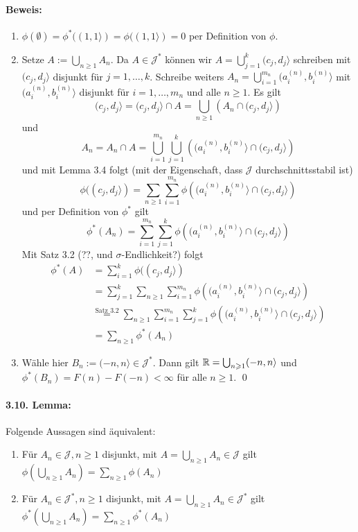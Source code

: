 \paragraph{Beweis:}
\begin{enumerate}[label=(\roman*)]
    \item $\phi(\emptyset)=\phi^*((1,1\rangle)=\phi((1,1\rangle)=0$ per Definition von $\phi$.
    \item Setze $A:=\bigcup_{n\geq1}A_n$. Da $A\in\mathcal{J}^*$ k\"onnen wir $A=\bigcup_{j=1}^k(c_j,d_j\rangle$ schreiben mit $(c_j,d_j\rangle$ disjunkt f\"ur $j=1,\hdots,k$. Schreibe weiters $A_n=\bigcup_{i=1}^{m_n}(a_i^{(n)},b_i^{(n)}\rangle$ mit $(a_i^{(n)},b_i^{(n)}\rangle$ disjunkt f\"ur $i=1,\hdots,m_n$ und alle $n\geq1$. Es gilt 
    $$(c_j,d_j\rangle=(c_j,d_j\rangle\cap A=\bigcup_{n\geq1}\left(A_n\cap(c_j,d_j\rangle\right)$$
    und
    $$A_n=A_n\cap A=\bigcup_{i=1}^{m_n}\bigcup_{j=1}^k\left((a_i^{(n)},b_i^{(n)}\rangle\cap(c_j,d_j\rangle\right)$$
    und mit Lemma 3.4 folgt (mit der Eigenschaft, dass $\mathcal{J}$ durchschnittsstabil ist)
    $$\phi((c_j,d_j\rangle)=\sum_{n\geq1}\sum_{i=1}^{m_n}\phi\left((a_i^{(n)},b_i^{(n)}\rangle\cap(c_j,d_j\rangle\right)$$
    und per Definition von $\phi^*$ gilt
    $$\phi^*(A_n)=\sum_{i=1}^{m_n}\sum_{j=1}^k\phi\left((a_i^{(n)},b_i^{(n)}\rangle\cap(c_j,d_j\rangle\right)$$
    Mit Satz 3.2 (??, und $\sigma$-Endlichkeit?) folgt 
    \begin{align*}
        \phi^*(A)&=\sum_{i=1}^k\phi((c_j,d_j\rangle)\\
        &=\sum_{j=1}^k\sum_{n\geq1}\sum_{i=1}^{m_n}\phi\left((a_i^{(n)},b_i^{(n)}\rangle\cap(c_j,d_j\rangle\right)\\
        &\overset{\text{Satz 3.2}}{=}\sum_{n\geq1}\sum_{i=1}^{m_n}\sum_{j=1}^k\phi\left((a_i^{(n)},b_i^{(n)}\rangle\cap(c_j,d_j\rangle\right)\\
        &=\sum_{n\geq1}\phi^*(A_n)
    \end{align*}
    \item W\"ahle hier $B_n:=(-n,n\rangle\in\mathcal{J}^*$. Dann gilt $\mathbb{R}=\bigcup_{n\geqslant1}(-n,n\rangle$ und $\phi^*(B_n)=F(n)-F(-n)<\infty$ f\"ur alle $n\geq1$. \qed
\end{enumerate}

\paragraph{3.10. Lemma:}Folgende Aussagen sind \"aquivalent:
\begin{enumerate}[label=(\roman*)]
    \item F\"ur $A_n\in\mathcal{J},n\geq1$ disjunkt, mit $A=\bigcup_{n\geq1}A_n\in\mathcal{J}$ gilt $\phi\left(\bigcup_{n\geq1}A_n\right)=\sum_{n\geq1}\phi(A_n)$
    \item F\"ur $A_n\in\mathcal{J}^*,n\geq1$ disjunkt, mit $A=\bigcup_{n\geq1}A_n\in\mathcal{J}^*$ gilt $\phi^*\left(\bigcup_{n\geq1}A_n\right)=\sum_{n\geq1}\phi^*(A_n)$
\end{enumerate}

